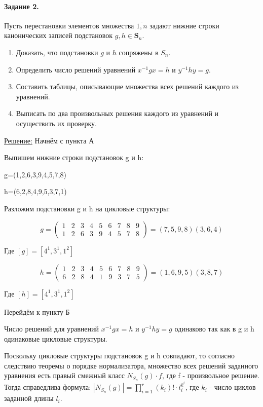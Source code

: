 \documentclass[utf8,14pt,a4paper,oneside,russian]{book}
\begin{document}
	\paragraph*{Задание 2.} Пусть перестановки элементов множества $\overline{1,n}$ задают нижние строки канонических записей подстановок $g,h\in \mathbf{S}_n$.
	\begin{enumerate}[label=\asbuk{enumi})]
		\item Доказать, что подстановки $g$ и $h$ сопряжены в $S_{n}$.
		\item Определить число решений уравнений $x^{-1}gx=h$ и $y^{-1}hy=g$.
		\item Составить таблицы, описывающие множества всех решений каждого из уравнений.
		\item Выписать по два произвольных решения каждого из уравнений и осуществить их проверку.
	\end{enumerate}
	\underline{Решение:} Начнём с пункта А
	
	Выпишем нижние строки подстановок g и h:
	
	g=(1,2,6,3,9,4,5,7,8)
	
	h=(6,2,8,4,9,5,3,7,1)
	
	Разложим подстановки g и h на цикловые структуры:
	
	\[ g = \left( 
	\begin{array}{ccccccccccccccccccc}
	1&2&3&4&5&6&7&8&9\\
	1&2&6&3&9&4&5&7&8
	\end{array} 
	\right)=(7,5,9,8)(3,6,4)\]
	
	Где $[g]=[4^{1},3^{1},1^{2}]$
	
	\[ h = \left( 
	\begin{array}{ccccccccccccccccccc}
	1&2&3&4&5&6&7&8&9\\
	6&2&8&4&1&9&3&7&5
	\end{array} 
	\right)=(1,6,9,5)(3,8,7)\]
	
	Где $[h]=[4^{1},3^{1},1^{2}]$
	
	\vspace{\baselineskip}
	
	Перейдём к пункту Б
	
	Число решений для уравнений $x^{-1}gx=h$ и $y^{-1}hy=g$ одинаково так как в g и h одинаковые цикловые структуры. 
	
	Поскольку цикловые структуры подстановок g и h совпадают, то согласно следствию теоремы о порядке нормализатора, множество всех решений заданного уравнения есть правый смежный класс $N_{S_{n}}(g)\cdot f$, где f - произвольное решение. Тогда справедлива формула:
	$|N_{S_{n}}(g)|=\prod_{i=1}^{r}(k_{i})! \cdot l_{i}^{k^{i}}$, где $k_{i}$ - число циклов заданной длины $l_{i}$.
	
\end{document}
